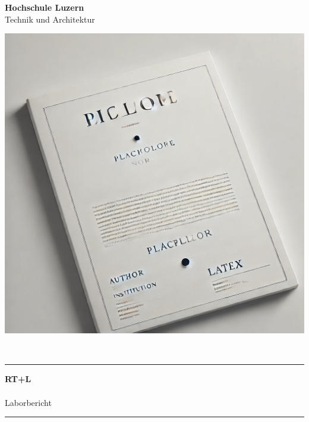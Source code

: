 \begin{titlepage}
    \begin{center}
        \textbf{\huge{Hochschule Luzern}}\\
        \vspace{2mm}
        \large{Technik und Architektur}\\
        \vspace{5mm}
    \end{center}

    \vspace{0mm}

    \begin{center}
        \includegraphics[trim=0cm 0cm 0cm 0cm,clip=true, width=0.7\linewidth]{./figure/cover_image.png}
        \\
    \end{center} 


    \begin{center}
        \rule{\textwidth}{2pt}
    \end{center}

    \begin{center}
      \textbf{\huge{RT+L}}\\
        \vspace{2mm}
        \Large{\makeatletter \@title  \makeatother}\\
        \vspace{2mm}
        \large{Laborbericht}
    \end{center}

    \begin{center}
        \rule{\textwidth}{2pt}
    \end{center}


\end{titlepage}
